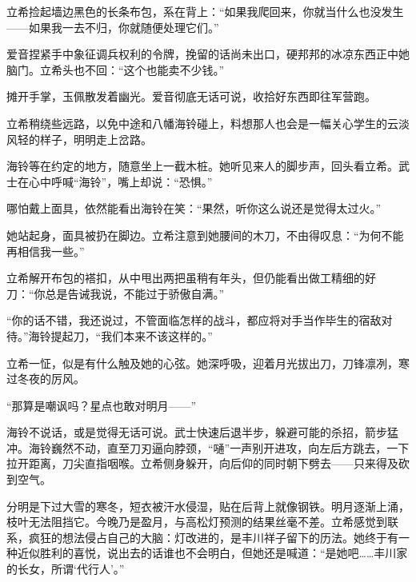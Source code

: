 \documentclass{article}
\begin{document}
立希捡起墙边黑色的长条布包，系在背上：“如果我爬回来，你就当什么也没发生——如果我一去不归，你就随便处理它们。”



爱音捏紧手中象征调兵权利的令牌，挽留的话尚未出口，硬邦邦的冰凉东西正中她脑门。立希头也不回：“这个也能卖不少钱。”



摊开手掌，玉佩散发着幽光。爱音彻底无话可说，收拾好东西即往军营跑。



立希稍绕些远路，以免中途和八幡海铃碰上，料想那人也会是一幅关心学生的云淡风轻的样子，明明走上岔路。



海铃等在约定的地方，随意坐上一截木桩。她听见来人的脚步声，回头看立希。武士在心中呼喊“海铃”，嘴上却说：“恐惧。”



哪怕戴上面具，依然能看出海铃在笑：“果然，听你这么说还是觉得太过火。”



她站起身，面具被扔在脚边。立希注意到她腰间的木刀，不由得叹息：“为何不能再相信我一些。”



立希解开布包的褡扣，从中甩出两把虽稍有年头，但仍能看出做工精细的好刀：“你总是告诫我说，不能过于骄傲自满。”



“你的话不错，我还说过，不管面临怎样的战斗，都应将对手当作毕生的宿敌对待。”海铃提起刀，“我们本来不该这样的。”



立希一怔，似是有什么触及她的心弦。她深呼吸，迎着月光拔出刀，刀锋凛冽，寒过冬夜的厉风。



“那算是嘲讽吗？星点也敢对明月——”



海铃不说话，或是觉得无话可说。武士快速后退半步，躲避可能的杀招，箭步猛冲。海铃巍然不动，直至刀刃逼向脖颈，“嗵”一声别开进攻，向左后方跳去，一下拉开距离，刀尖直指咽喉。立希侧身躲开，向后仰的同时朝下劈去——只来得及砍到空气。



分明是下过大雪的寒冬，短衣被汗水侵湿，贴在后背上就像钢铁。明月逐渐上涌，枝叶无法阻挡它。今晚乃是盈月，与高松灯预测的结果丝毫不差。立希感觉到联系，疯狂的想法侵占自己的大脑：灯改进的，是丰川祥子留下的历法。她终于有一种近似胜利的喜悦，说出去的话谁也不会明白，但她还是喊道：“是她吧……丰川家的长女，所谓‘代行人’。”
\end{document}

